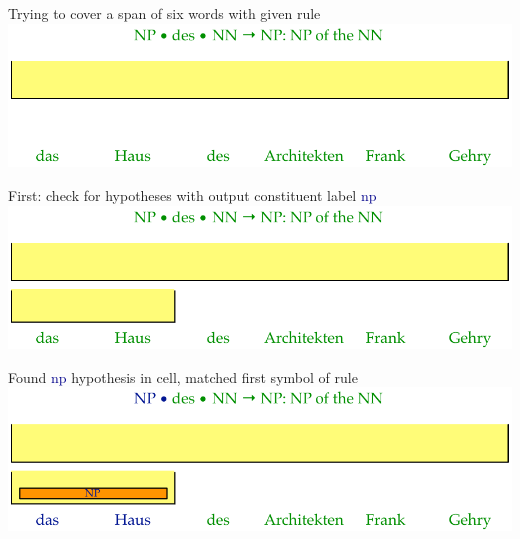 \documentclass[landscape]{slides}
\newcommand{\example}[1]{\textcolor{darkblue}{\rm #1}}
\begin{document}

\vspace{20mm}
\begin{center}
Trying to cover a span of six words with given rule\\[20mm]
\includegraphics[scale=1.6]{rule-lookup1.pdf}
\end{center}


\vspace{20mm}
\begin{center}
First: check for hypotheses with output constituent label \example{\sc np}\\[20mm]
\includegraphics[scale=1.6]{rule-lookup2.pdf}
\end{center}


\vspace{20mm}
\begin{center}
Found \example{\sc np} hypothesis in cell, matched first symbol of rule\\[20mm]
\includegraphics[scale=1.6]{rule-lookup3.pdf}
\end{center}
\end{document}
